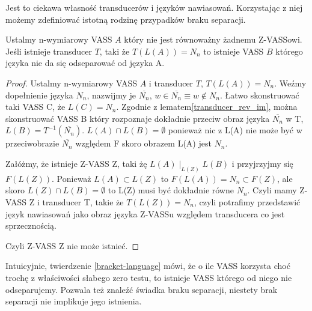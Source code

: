     Jest to ciekawa własność transducerów i języków nawiasowań.
    Korzystając z niej możemy zdefiniować istotną rodzinę przypadków braku separacji.

    \begin{theorem}
        \label{bracket-language}
        Ustalmy n-wymiarowy VASS $A$ który nie jest równoważny żadnemu Z-VASSowi.
        Jeśli istnieje transducer $T$, taki że $T(L(A)) = N_n$ to istnieje VASS $B$ którego języka nie da się odseparować od języka A.
    \end{theorem}
    \begin{proof}
        Ustalmy n-wymiarowy VASS $A$ i transducer $T$, $T(L(A)) = N_n$.
        Weźmy dopełnienie języka $N_n$, nazwijmy je $\overline{N_n}$, $w \in \overline{N_n} \equiv w \notin N_n$.
        Łatwo skonstruować taki VASS C, że $L(C) = N_n$.
        Zgodnie z lematem\ref{transducer_rev_im}, można skonstruować VASS B który rozpoznaje dokładnie przeciw obraz języka
        $\overline{N_n}$ w T, $L(B) = T^{-1}(\overline{N_n})$.
        $L(A) \cap L(B) = \emptyset$ ponieważ nic z L(A) nie może być w przeciwobrazie $\overline{N_n}$ względem F skoro obrazem L(A) jest $N_n$.

        Załóżmy, że istnieje Z-VASS Z, taki żę $L(A) \mid_{L(Z)} L(B)$ i przyjrzyjmy się $F(L(Z))$.
        Ponieważ $L(A) \subset L(Z)$ to $F(L(A)) = N_n \subset F(Z)$, ale skoro $L(Z) \cap L(B) = \emptyset$ to L(Z) musi być dokładnie równe $N_n$.
        Czyli mamy Z-VASS Z i transducer T, takie że $T(L(Z)) = N_n$, czyli potrafimy przedstawić język nawiasowań jako obraz
        języka Z-VASSu względem transducera co jest sprzecznością.

        Czyli Z-VASS Z nie może istnieć.

    \end{proof}

    Intuicyjnie, twierdzenie \ref{bracket-language} mówi, że o ile VASS korzysta choć trochę z właściwości słabego zero testu,
    to istnieje VASS którego od niego nie odseparujemy.
    Pozwala też znaleźć świadka braku separacji, niestety brak separacji nie implikuje jego istnienia.


